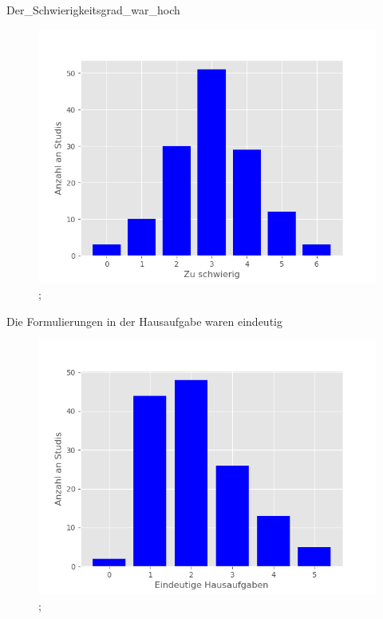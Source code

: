 \documentclass[10pt]{beamer}
\begin{document}
\begin{frame}[fragile]{Der_Schwierigkeitsgrad_war_hoch} 
 \begin{figure}
 \includegraphics[width= 0.9\linewidth]{./PDFcreater/Plots/Der_Schwierigkeitsgrad_war_hoch.png};
 \end{figure}
 \end{frame}
\begin{frame}[fragile]{Die Formulierungen in der Hausaufgabe waren eindeutig} 
 \begin{figure}
 \includegraphics[width= 0.9\linewidth]{./PDFcreater/Plots/Die Formulierungen in der Hausaufgabe waren eindeutig.png};
 \end{figure}
 \end{frame}
\end{document}
